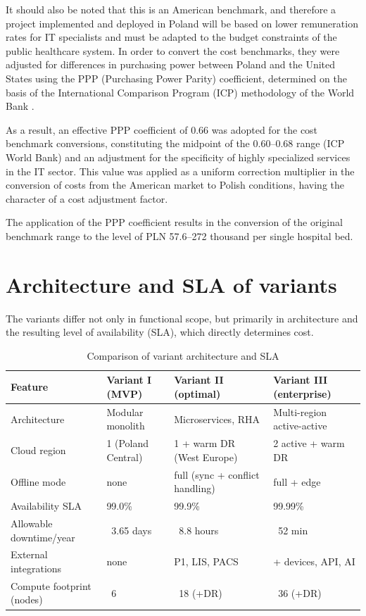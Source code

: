 It should also be noted that this is an American benchmark, and therefore a project implemented and deployed in Poland will be based on lower remuneration rates for IT specialists and must be adapted to the budget constraints of the public healthcare system. In order to convert the cost benchmarks, they were adjusted for differences in purchasing power between Poland and the United States using the PPP (Purchasing Power Parity) coefficient, determined on the basis of the International Comparison Program (ICP) methodology of the World Bank \cite{WorldBank_ICP_Methodology}.

As a result, an effective PPP coefficient of 0.66 was adopted for the cost benchmark conversions, constituting the midpoint of the 0.60--0.68 range (ICP World Bank) and an adjustment for the specificity of highly specialized services in the IT sector. This value was applied as a uniform correction multiplier in the conversion of costs from the American market to Polish conditions, having the character of a cost adjustment factor.

The application of the PPP coefficient results in the conversion of the original benchmark range to the level of PLN 57.6--272 thousand per single hospital bed.

\section{Architecture and SLA of variants}

The variants differ not only in functional scope, but primarily in architecture and the resulting level of availability (SLA), which directly determines cost.

\begin{table}[h]
\centering
\small
\renewcommand{\arraystretch}{1.2}
\begin{tabular}{|L{3.2cm}|L{3.8cm}|L{3.8cm}|L{3.8cm}|}
\hline
{}\textbf{Feature} & \textbf{Variant I (MVP)} & \textbf{Variant II (optimal)} & \textbf{Variant III (enterprise)} \\
\hline
Architecture & Modular monolith & Microservices, RHA & Multi-region active-active \\
\hline
Cloud region & 1 (Poland Central) & 1 + warm DR (West Europe) & 2 active + warm DR \\
\hline
Offline mode & none & full (sync + conflict handling) & full + edge \\
\hline
Availability SLA & 99.0\% & 99.9\% & 99.99\% \\
\hline
Allowable downtime/year & ~3.65 days & ~8.8 hours & ~52 min \\
\hline
External integrations & none & P1, LIS, PACS & + devices, API, AI \\
\hline
Compute footprint (nodes) & ~6 & ~18 (+DR) & ~36 (+DR) \\
\hline
\end{tabular}
\caption{Comparison of variant architecture and SLA}
\label{tab:architektura}
\end{table}

